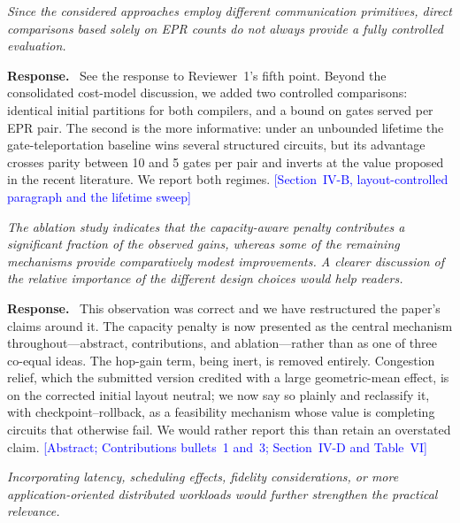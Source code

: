 \documentclass[11pt]{article}
\newenvironment{comment}{\medskip\noindent\itshape}{\par}
\newcommand{\response}{\smallskip\noindent\textbf{Response.}\ }
\newcommand{\where}[1]{\textcolor{blue}{[#1]}}
\begin{document}
\begin{comment}
Since the considered approaches employ different communication
primitives, direct comparisons based solely on EPR counts do not always
provide a fully controlled evaluation.
\end{comment}

\response
See the response to Reviewer~1's fifth point.  Beyond the consolidated
cost-model discussion, we added two controlled comparisons: identical
initial partitions for both compilers, and a bound on gates served per
EPR pair.  The second is the more informative: under an unbounded
lifetime the gate-teleportation baseline wins several structured
circuits, but its advantage crosses parity between 10 and 5 gates per
pair and inverts at the value proposed in the recent literature.  We
report both regimes.
\where{Section~IV-B, layout-controlled paragraph and the
lifetime sweep}

\begin{comment}
The ablation study indicates that the capacity-aware penalty
contributes a significant fraction of the observed gains, whereas some
of the remaining mechanisms provide comparatively modest improvements.
A clearer discussion of the relative importance of the different design
choices would help readers.
\end{comment}

\response
This observation was correct and we have restructured the paper's
claims around it.  The capacity penalty is now presented as the central
mechanism throughout---abstract, contributions, and ablation---rather
than as one of three co-equal ideas.  The hop-gain term, being inert,
is removed entirely.  Congestion relief, which the submitted version
credited with a large geometric-mean effect, is on the corrected
initial layout neutral; we now say so plainly and reclassify it, with
checkpoint--rollback, as a feasibility mechanism whose value is
completing circuits that otherwise fail.  We would rather report this
than retain an overstated claim.
\where{Abstract; Contributions bullets~1 and~3; Section~IV-D and
Table~VI}

\begin{comment}
Incorporating latency, scheduling effects, fidelity considerations, or
more application-oriented distributed workloads would further
strengthen the practical relevance.
\end{comment}
\end{document}
